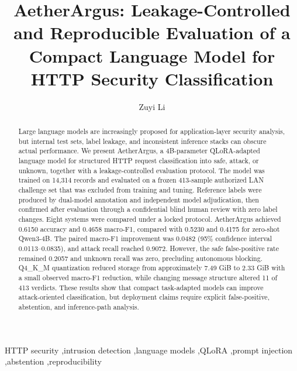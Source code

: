 \documentclass[preprint,12pt,authoryear]{elsarticle}
\newcommand{\model}{AetherArgus}
\begin{document}
\begin{frontmatter}

\title{\model: Leakage-Controlled and Reproducible Evaluation of a Compact Language Model for HTTP Security Classification}

\author[aff1]{Zuyi Li}

\address[aff1]{Hebei Xiong'an Qiongyu Technology Co., Ltd., No. 621-045, Xiong'an High-tech Zone Service Center, Xiong'an Area, China (Hebei) Pilot Free Trade Zone, Xiong'an New Area, Hebei 071700, China}

\begin{abstract}
Large language models are increasingly proposed for application-layer security analysis, but internal test sets, label leakage, and inconsistent inference stacks can obscure actual performance. We present AetherArgus, a 4B-parameter QLoRA-adapted language model for structured HTTP request classification into safe, attack, or unknown, together with a leakage-controlled evaluation protocol. The model was trained on 14,314 records and evaluated on a frozen 413-sample authorized LAN challenge set that was excluded from training and tuning. Reference labels were produced by dual-model annotation and independent model adjudication, then confirmed after evaluation through a confidential blind human review with zero label changes. Eight systems were compared under a locked protocol. AetherArgus achieved 0.6150 accuracy and 0.4658 macro-F1, compared with 0.5230 and 0.4175 for zero-shot Qwen3-4B. The paired macro-F1 improvement was 0.0482 (95\% confidence interval 0.0113--0.0835), and attack recall reached 0.9072. However, the safe false-positive rate remained 0.2057 and unknown recall was zero, precluding autonomous blocking. Q4\_K\_M quantization reduced storage from approximately 7.49 GiB to 2.33 GiB with a small observed macro-F1 reduction, while changing message structure altered 11 of 413 verdicts. These results show that compact task-adapted models can improve attack-oriented classification, but deployment claims require explicit false-positive, abstention, and inference-path analysis.
\end{abstract}

\begin{keyword}
HTTP security \sep intrusion detection \sep language models \sep QLoRA \sep prompt injection \sep abstention \sep reproducibility
\end{keyword}

\end{frontmatter}
\end{document}
